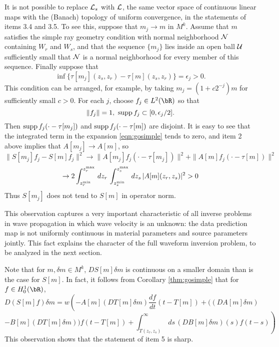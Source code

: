 \begin{rem}
\label{rem:nounif}
  It is not possible to replace ${\cal L}_s$ with ${\cal L}$, the same
  vector space of continuous linear maps with the (Banach) topology of
  uniform convergence, in the statements of items 3.4 and 3.5. To see
  this, suppose that $m_j \rightarrow m$ in $M^k$. Assume that $m$
  satisfies the simple ray geometry condition with normal neighborhood
  ${\cal N}$ containing $W_r$ and $W_s$, and that the sequence
  $\{m_j\}$ lies inside an open ball ${\cal U}$ sufficiently small
  that ${\cal N}$ is a normal neighborhood for every member of this
  sequence. Finally suppose that
\[
\inf\{\tau[m_j](z_s,z_r) -\tau[m](z_s,z_r)\}=\epsilon_j > 0.
\]
This condition can be arranged, for example, by taking
$m_j=(1+c2^{-j})m$ for sufficiently small $c>0$. For each $j$, choose
$f_j \in L^2(\bR)$ so that 
\[
\|f_j\|=1,\,\,{\rm supp}\,f_j \subset [0,\epsilon_j/2].
\]
Then ${\rm supp}\,f_j(\cdot-\tau[m_j])$ and ${\rm supp}\,f_j(\cdot-\tau[m])$ are
disjoint. It is easy to see that the integrated term in the expansion
\ref{eqn:gosimple} tends to zero,  and item 2 above implies that
$A[m_j] \rightarrow A[m]$, so 
\[
\|S[m_j]f_j-S[m]f_j\|^2\rightarrow \|A[m_j]f_j(\cdot-\tau[m_j])\|^2 + \|A[m]f_j(\cdot-\tau[m])\|^2 
\]
\[
\rightarrow 2 \int_{z_r^{\rm min}}^{z_r^{\rm
    max}}\,dz_r\,\int_{z_s^{\rm min}}^{z_s^{\rm
    max}}\,dz_s\,|A[m](z_r,z_s)|^2 > 0
\]
Thus $S[m_j]$ does not tend to $S[m]$ in operator norm. 

This observation captures a very important characteristic of all
inverse problems in wave propagation in which wave velocity is an
unknown: the data prediction map is not uniformly continuous in
material parameters and source parameters jointly. This fact explains
the character of the full waveform inversion problem, to be analyzed
in the next section.
\end{rem}

\begin{rem}
\label{rem:derivloss}
Note that for $m, \delta m \in M^k$, $DS[m]\delta m$ is continuous
on a smaller domain than is the case for $S[m]$. In fact, it follows
from Corollary \ref{thm:gosimple} that for $f \in H^1_0(\bR)$,
\[
D(S[m]f)\delta m  = w\left(-A[m](DT[m]\delta m)\frac{df}{dt}(t-T[m]) +
((DA[m]\delta m)\right.
\]
\begin{equation}
\label{eqn:preq}
\left. -B[m](DT[m]\delta m))f(t-T[m]) + \int_{T(z_r,z_s)}^{\infty} \,ds\,
(DB[m]\delta m)(s)f(t-s)\right)
\end{equation}
This observation shows that the statement of item 5 is sharp.
\end{rem}

